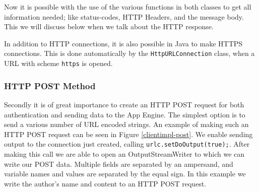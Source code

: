 Now it is possible with the use of the various functions in both classes to get
all information needed; like status-codes, HTTP Headers, and the message body.
This we will discuss below when we talk about the HTTP response.

In addition to HTTP connections, it is also possible in Java to make HTTPS
connections. This is done automatically by the \texttt{HttpURLConnection}
class, when a URL with scheme \texttt{https} is opened.

% 
% 
% 

\subsubsection{HTTP POST Method}
Secondly it is of great importance to create an HTTP POST request for both
authentication and sending data to the App Engine. The simplest option is to send
a various number of URL encoded strings. An example of making such an HTTP POST
request can be seen in Figure \ref{clientimpl-post}. We enable sending output to
the connection just created, calling \texttt{urlc.setDoOutput(true);}. After
making this call we are able to open an OutputStreamWriter to which we can write
our POST data. Multiple fields are separated by an ampersand, and variable names
and values are separated by the equal sign. In this example we write the author's
name and content to an HTTP POST request.

